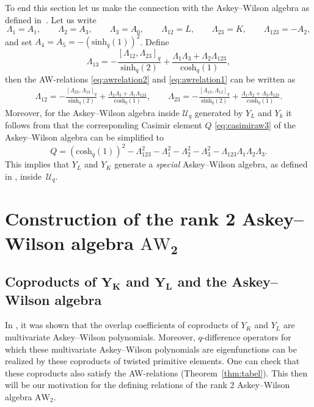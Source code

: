 \documentclass[pdftex]{sigma}
\numberwithin{equation}{section}
\newcommand{\AW}[1]{\mathrm{AW}_{#1}}
\newcommand{\bivariateawalgebra}{rank 2 Askey--Wilson algebra }
\newcommand{\chq}{\mathrm{cosh}_q}
\newcommand{\shq}{\mathrm{sinh}_q}
\newcommand{\Uq}{\mathcal{U}_q}
\begin{document}
To end this section let us make the connection with the Askey--Wilson algebra as defined in~\cite{CFGPRV2021}.
Let us write
\[
\Lambda_1=A_1, \qquad \Lambda_2=A_3, \qquad \Lambda_3=A_0,\qquad
\Lambda_{12} = L, \qquad \Lambda_{23}=K, \qquad \Lambda_{123}=-A_2,
\]
and set $A_4=A_5=-(\shq(1))^2$. Define
\[
\Lambda_{13}= -\frac{[\Lambda_{12},\Lambda_{23}]_q}{\shq(2)} + \frac{\Lambda_1 \Lambda_3+ \Lambda_2 \Lambda_{123}}{\chq(1)},
\]
then the AW-relations \eqref{eq:awrelation2} and \eqref{eq:awrelation1} can be written as
\begin{gather*}
	\Lambda_{12}= -\frac{[\Lambda_{23},\Lambda_{13}]_q}{\shq(2)} + \frac{\Lambda_2 \Lambda_3+ \Lambda_1 \Lambda_{123}}{\chq(1)}, \qquad
	\Lambda_{23}= -\frac{[\Lambda_{13},\Lambda_{12}]_q}{\shq(2)} + \frac{\Lambda_1 \Lambda_2+ \Lambda_3 \Lambda_{123}}{\chq(1)}.
\end{gather*}
Moreover, for the Askey--Wilson algebra inside $\Uq$ generated by $Y_L$ and $Y_k$ it follows from \cite[Theorem~2.17]{Terwilliger2011a} that the corresponding Casimir element $Q$ \eqref{eq:casimiraw3} of the Askey--Wilson algebra can be simplified to
\[
Q= (\chq(1))^2-\Lambda_{123}^2 - \Lambda_1^2-\Lambda_2^2 - \Lambda_3^2 - \Lambda_{123}\Lambda_1\Lambda_2\Lambda_3.
\]
This implies that $Y_L$ and $Y_K$ generate a \textit{special} Askey--Wilson algebra, as defined in \cite[Section~2.1]{CFGPRV2021}, inside~$\Uq$.

\section[Construction of the rank 2 Askey-Wilson algebra AW\_2]{Construction of the \bivariateawalgebra $\boldsymbol{\AW{2}}$}\label{sec:aw2}

\subsection[Coproducts of Y\_K and Y\_L and the Askey-Wilson algebra]{Coproducts of $\boldsymbol{Y_K}$ and $\boldsymbol{Y_L}$ and the Askey--Wilson algebra}\label{subsec:coproduc}

In \cite{Groenevelt2021}, it was shown that the overlap coefficients of coproducts of $Y_{K}$ and $Y_{L}$ are multivariate Askey--Wilson polynomials. Moreover, $q$-difference operators for which these multivariate Askey--Wilson polynomials are eigenfunctions can be realized by these coproducts of twisted primitive elements. One can check that these coproducts also satisfy the AW-relations (Theorem~\ref{thm:tabel}). This then will be our motivation for the defining relations of the \bivariateawalgebra $\AW{2}$.
\end{document}

